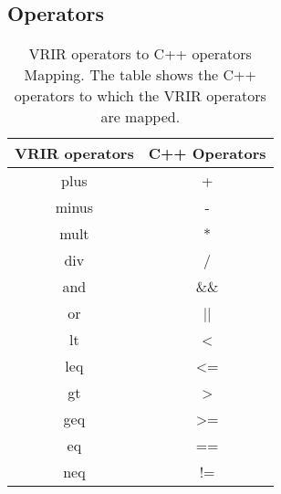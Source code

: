 \subsection{Operators}
\label{subsec:operators}
			\begin{table}[htbp]
					\centering
					\begin{tabular}{|c|c|}
					\hline
					VRIR operators & C++ Operators \\ \hline
					plus           & +             \\ \hline
					minus          & -             \\ \hline
					mult           & *             \\ \hline
					div            & /             \\ \hline
					and            & \&\&           \\ \hline
					or             & ||            \\ \hline
					lt             & \textless     \\ \hline
					leq            & \textless=    \\ \hline
					gt             & \textgreater  \\ \hline
					geq            & \textgreater= \\ \hline
					eq             & ==            \\ \hline
					neq            & !=            \\ \hline
					\end{tabular}
					\caption[opMap]{VRIR operators to C++ operators Mapping. The table shows the C++ operators to which the VRIR operators are mapped.}
					\label{tab:opMap}
					\end{table}
